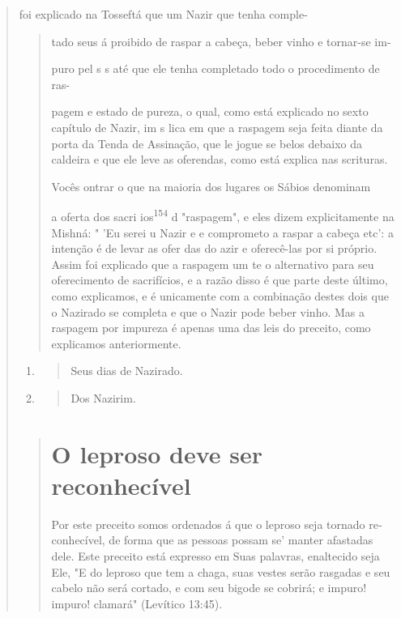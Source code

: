 \begin{quote}
foi explicado na Tosseftá que um Nazir que tenha comple-

\begin{quote}
tado seus á proibido de raspar a cabeça, beber vinho e tornar-se im-

puro pel s s até que ele tenha completado todo o procedimento de ras-

pagem e estado de pureza, o qual, como está explicado no sexto capítulo
de Nazir, im s lica em que a raspagem seja feita diante da porta da
Tenda de Assina­ção, que le jogue se belos debaixo da caldeira e que ele
leve as oferendas, como está explica nas scrituras.

Vocês ontrar o que na maioria dos lugares os Sábios denominam

a oferta dos sacri ios\textsuperscript{154} d "raspagem", e eles dizem
explicitamente na Mish­ná: " 'Eu serei u Nazir e e comprometo a raspar a
cabeça etc': a intenção é de levar as ofer das do azir e oferecê-las por
si próprio. Assim foi explica­do que a raspagem um te o alternativo para
seu oferecimento de sacrifícios, e a razão disso é que parte deste
último, como explicamos, e é unicamente com a combinação destes dois que
o Nazirado se completa e que o Nazir pode beber vinho. Mas a raspagem
por impureza é apenas uma das leis do preceito, como explicamos
anteriormente.
\end{quote}

\begin{enumerate}
\def\labelenumi{\arabic{enumi}.}
\setcounter{enumi}{152}
\item
 \begin{quote}
 Seus dias de Nazirado.
 \end{quote}
\item
 \begin{quote}
 Dos Nazirim.
 \end{quote}
\end{enumerate}

\begin{quote}


\section{O leproso deve ser reconhecível}

Por este preceito somos ordenados á que o leproso seja tornado
re­conhecível, de forma que as pessoas possam se' manter afastadas dele.
Este pre­ceito está expresso em Suas palavras, enaltecido seja Ele, "E
do leproso que tem a chaga, suas vestes serão rasgadas e seu cabelo não
será cortado, e com seu bigode se cobrirá; e impuro! impuro! clamará"
(Levítico 13:45).


\end{quote}
\end{quote}
